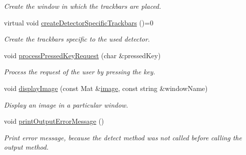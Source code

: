 \begin{DoxyCompactItemize}
\begin{DoxyCompactList}\small\item\em Create the window in which the trackbars are placed. \end{DoxyCompactList}\item 
virtual void \hyperlink{classmultiscale_1_1analysis_1_1Detector_a930ad07f5b8d9f21e6758341f71ae31a}{create\-Detector\-Specific\-Trackbars} ()=0
\begin{DoxyCompactList}\small\item\em Create the trackbars specific to the used detector. \end{DoxyCompactList}\item 
void \hyperlink{classmultiscale_1_1analysis_1_1Detector_a72265d36d3fa22aa3c141eb4001fe2fe}{process\-Pressed\-Key\-Request} (char \&pressed\-Key)
\begin{DoxyCompactList}\small\item\em Process the request of the user by pressing the key. \end{DoxyCompactList}\item 
void \hyperlink{classmultiscale_1_1analysis_1_1Detector_ae68f8f87cc1e4e1cd22cee1e3604ef4b}{display\-Image} (const Mat \&\hyperlink{classmultiscale_1_1analysis_1_1Detector_a523830a6cfe409694ce8327c3c736fbd}{image}, const string \&window\-Name)
\begin{DoxyCompactList}\small\item\em Display an image in a particular window. \end{DoxyCompactList}\item 
void \hyperlink{classmultiscale_1_1analysis_1_1Detector_a9150f3fc7945405da34761a4250b7c79}{print\-Output\-Error\-Message} ()
\begin{DoxyCompactList}\small\item\em Print error message, because the detect method was not called before calling the output method. \end{DoxyCompactList}\end{DoxyCompactItemize}
